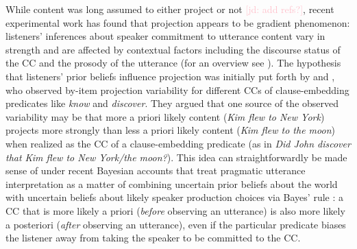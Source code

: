 \documentclass[11pt,fleqn]{article}
\newcommand{\jd}[1]{\textcolor{Pink}{[jd: #1]}}
\newcommand{\6}{\mbox{$[\hspace*{-.6mm}[$}}
\newcommand{\9}{\mbox{$]\hspace*{-.6mm}]$}}
\begin{document}
%
%
%
%
%
%
%

While content was long assumed to either project or not \jd{add refs?}, recent experimental work has found that projection appears to be gradient phenomenon: listeners' inferences about speaker commitment to utterance content vary in strength and are affected by contextual factors including the discourse status of the CC and the prosody of the utterance (for an overview see ). The hypothesis that listeners' prior beliefs influence projection was initially put forth by  and , who observed by-item projection variability for different CCs of clause-embedding predicates like \emph{know} and \emph{discover}. They argued that one source of the observed variability may be that more a priori likely content ({\em Kim flew to New York}) projects more strongly than less a priori likely content  ({\em Kim flew to the moon}) when realized as the CC of a clause-embedding predicate (as in \emph{Did John discover that Kim flew to New York/the moon?}). This idea can straightforwardly be made sense of under recent Bayesian accounts that treat pragmatic utterance interpretation as a matter of combining uncertain prior beliefs about the world with uncertain beliefs about likely speaker production choices via Bayes' rule \cite{GoodmanFrank2016, degen-etal2015}: a CC that is more likely a priori (\emph{before} observing an utterance) is also more likely a posteriori (\emph{after} observing an utterance), even if the particular predicate biases the listener away from taking the speaker to be committed to the CC.
\end{document}
